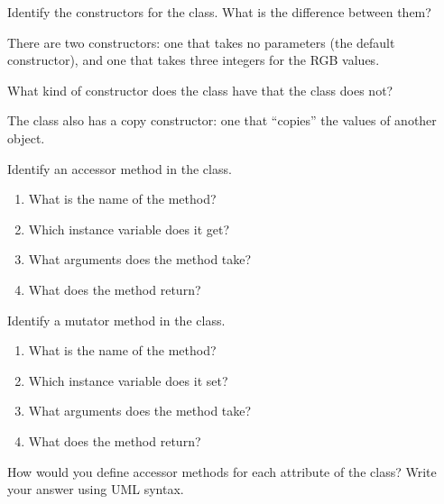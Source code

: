 



\Q Identify the constructors for the  class.
What is the difference between them?

\begin{answer}[3em]
There are two constructors: one that takes no parameters (the default constructor), and one that takes three integers for the RGB values.
\end{answer}


\Q What kind of constructor does the  class have that the  class does not?

\begin{answer}[3em]
The  class also has a copy constructor: one that ``copies'' the values of another object.
\end{answer}


\Q Identify an accessor method in the  class.

\begin{enumerate}
\item What is the name of the method? 
\item Which instance variable does it get? 
\item What arguments does the method take? 
\item What does the method return? 
\end{enumerate}


\Q Identify a mutator method in the  class.

\begin{enumerate}
\item What is the name of the method? 
\item Which instance variable does it set? 
\item What arguments does the method take? 
\item What does the method return? 
\end{enumerate}


\Q How would you define accessor methods for each attribute of the  class?
Write your answer using UML syntax.

